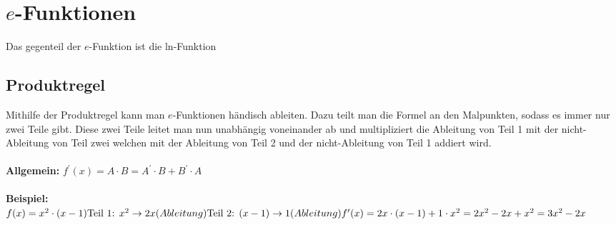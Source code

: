 \section{$e$-Funktionen}

Das gegenteil der $e$-Funktion ist die ln-Funktion

\subsection{Produktregel}
Mithilfe der Produktregel kann man $e$-Funktionen händisch ableiten. Dazu teilt man die Formel an den Malpunkten, sodass es immer nur zwei Teile gibt. Diese zwei Teile leitet man nun unabhängig voneinander ab und multipliziert die Ableitung von Teil 1 mit der nicht-Ableitung von Teil zwei welchen mit der Ableitung von Teil 2 und der nicht-Ableitung von Teil 1 addiert wird.
\\
\\
\textbf{Allgemein:} $f^{\prime}(x) = A \cdot B = A^{\prime} \cdot B  + B^{\prime} \cdot A$
\\
\\
\textbf{Beispiel:}
\\
$
f(x) = x^{2} \cdot (x-1)
\\
\text{Teil 1: }x^{2} \rightarrow 2x (Ableitung)
\\
\text{Teil 2: }(x-1) \rightarrow 1 (Ableitung)
\\
f^{\prime}(x) = 2x \cdot (x-1) + 1 \cdot x^{2} \\
= 2x^{2}-2x + x^{2} \\
= 3x^{2}-2x
$